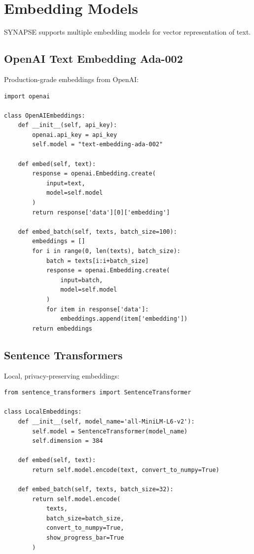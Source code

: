 \documentclass[12pt,a4paper]{report}
\begin{document}
\section{Embedding Models}

SYNAPSE supports multiple embedding models for vector representation of text.

\subsection{OpenAI Text Embedding Ada-002}

Production-grade embeddings from OpenAI:

\begin{lstlisting}
import openai

class OpenAIEmbeddings:
    def __init__(self, api_key):
        openai.api_key = api_key
        self.model = "text-embedding-ada-002"
    
    def embed(self, text):
        response = openai.Embedding.create(
            input=text,
            model=self.model
        )
        return response['data'][0]['embedding']
    
    def embed_batch(self, texts, batch_size=100):
        embeddings = []
        for i in range(0, len(texts), batch_size):
            batch = texts[i:i+batch_size]
            response = openai.Embedding.create(
                input=batch,
                model=self.model
            )
            for item in response['data']:
                embeddings.append(item['embedding'])
        return embeddings
\end{lstlisting}

\subsection{Sentence Transformers}

Local, privacy-preserving embeddings:

\begin{lstlisting}
from sentence_transformers import SentenceTransformer

class LocalEmbeddings:
    def __init__(self, model_name='all-MiniLM-L6-v2'):
        self.model = SentenceTransformer(model_name)
        self.dimension = 384
    
    def embed(self, text):
        return self.model.encode(text, convert_to_numpy=True)
    
    def embed_batch(self, texts, batch_size=32):
        return self.model.encode(
            texts,
            batch_size=batch_size,
            convert_to_numpy=True,
            show_progress_bar=True
        )
\end{lstlisting}
\end{document}
